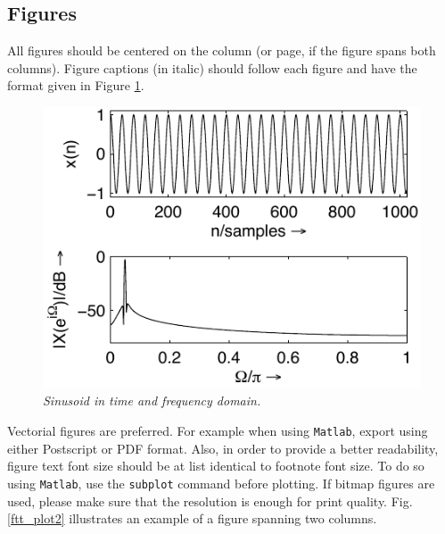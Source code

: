 \documentclass[twoside,a4paper]{article}
\begin{document}
\subsection{Figures}
\label{ssec:figures}
All figures should be centered on the column (or page, if the figure spans both columns).
Figure captions (in italic) should follow each figure and have the format given in Figure \ref{fft_plot}.
\begin{figure}[ht]
\centerline{\includegraphics[scale=0.8]{fft_plot2}}
\caption{\label{fft_plot}{\it Sinusoid in time and frequency domain.}}
\end{figure}
Vectorial figures are preferred. For example when using
\texttt{Matlab}, export using either Postscript or PDF format. Also,
in order to provide a better readability, figure text font size
should be at list identical to footnote font size. To do so using
\texttt{Matlab}, use the \texttt{subplot} command before plotting.
If bitmap figures are used, please make sure that the resolution is
enough for print quality. Fig. \ref{ftt_plot2} illustrates an
example of a figure spanning two columns.
\end{document}
